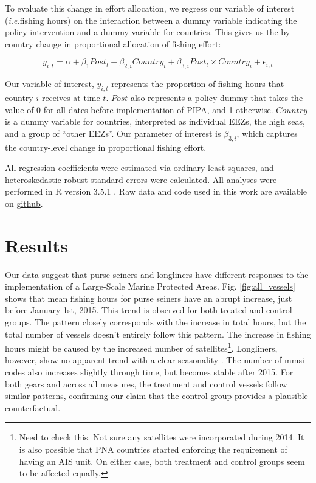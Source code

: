 \documentclass[12pt,]{article}
\let\rmarkdownfootnote\footnote%
\def\footnote{\protect\rmarkdownfootnote}
\begin{document}
To evaluate this change in effort allocation, we regress our variable of
interest (\emph{i.e.}fishing hours) on the interaction between a dummy
variable indicating the policy intervention and a dummy variable for
countries. This gives us the by-country change in proportional
allocation of fishing effort:

\[
y_{i,t} = \alpha + \beta_1Post_t + \beta_{2,i}Country_i + \beta_{3,i}Post_t \times Country_i + \epsilon_{i,t}
\]

Our variable of interest, \(y_{i,t}\) represents the proportion of
fishing hours that country \(i\) receives at time \(t\). \(Post\) also
represents a policy dummy that takes the value of 0 for all dates before
implementation of PIPA, and 1 otherwise. \(Country\) is a dummy variable
for countries, interpreted as individual EEZs, the high seas, and a
group of ``other EEZs''. Our parameter of interest is \(\beta_{3,i}\),
which captures the country-level change in proportional fishing effort.

All regression coefficients were estimated via ordinary least squares,
and heteroskedastic-robust standard errors were calculated. All analyses
were performed in R version 3.5.1 \citep{rcore_2018}. Raw data and code
used in this work are available on
\href{https://github.com/jcvdav/MPA_displacement}{github}.

\clearpage

\hypertarget{results}{%
\section{Results}\label{results}}

Our data suggest that purse seiners and longliners have different
responses to the implementation of a Large-Scale Marine Protected Areas.
Fig. \ref{fig:all_vessels} shows that mean fishing hours for purse
seiners have an abrupt increase, just before January 1st, 2015. This
trend is observed for both treated and control groups. The pattern
closely corresponds with the increase in total hours, but the total
number of vessels doesn't entirely follow this pattern. The increase in
fishing hours might be caused by the increased number of
satellites\footnote{Need to check this. Not sure any satellites were
  incorporated during 2014. It is also possible that PNA countries
  started enforcing the requirement of having an AIS unit. On either
  case, both treatment and control groups seem to be affected equally.}.
Longliners, however, show no apparent trend with a clear seasonality
\citep{ortuocrespo_2018}. The number of mmsi codes also increases
slightly through time, but becomes stable after 2015. For both gears and
across all measures, the treatment and control vessels follow similar
patterns, confirming our claim that the control group provides a
plausible counterfactual.
\end{document}
